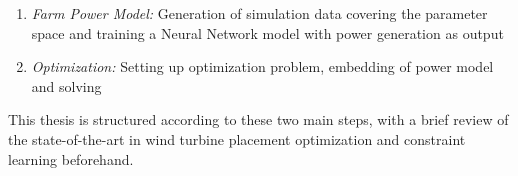\begin{enumerate}
	\item \textit{Farm Power Model:} Generation of simulation data covering the parameter space and training a Neural Network model with power generation as output
	\item \textit{Optimization:} Setting up optimization problem, embedding of power model and solving
\end{enumerate}

This thesis is structured according to these two main steps, with a brief review of the state-of-the-art in wind turbine placement optimization and constraint learning beforehand. 







